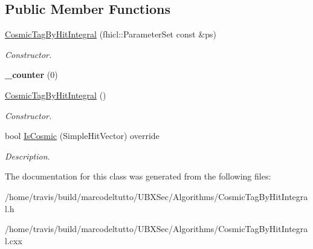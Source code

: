 \subsection*{\-Public \-Member \-Functions}
\begin{DoxyCompactItemize}
\item 
\hypertarget{classubana_1_1CosmicTagByHitIntegral_ae58970463cfcb6fa697e19073da6a91c}{\hyperlink{classubana_1_1CosmicTagByHitIntegral_ae58970463cfcb6fa697e19073da6a91c}{\-Cosmic\-Tag\-By\-Hit\-Integral} (fhicl\-::\-Parameter\-Set const \&ps)}\label{classubana_1_1CosmicTagByHitIntegral_ae58970463cfcb6fa697e19073da6a91c}

\begin{DoxyCompactList}\small\item\em \-Constructor. \end{DoxyCompactList}\item 
\hypertarget{classubana_1_1CosmicTagByHitIntegral_a5fda4bc8f4ea58a9861ac56bed66fe79}{{\bfseries \-\_\-counter} (0)}\label{classubana_1_1CosmicTagByHitIntegral_a5fda4bc8f4ea58a9861ac56bed66fe79}

\item 
\hypertarget{classubana_1_1CosmicTagByHitIntegral_ad51d5460821d3a81262f8515a8e08487}{\hyperlink{classubana_1_1CosmicTagByHitIntegral_ad51d5460821d3a81262f8515a8e08487}{\-Cosmic\-Tag\-By\-Hit\-Integral} ()}\label{classubana_1_1CosmicTagByHitIntegral_ad51d5460821d3a81262f8515a8e08487}

\begin{DoxyCompactList}\small\item\em \-Constructor. \end{DoxyCompactList}\item 
\hypertarget{classubana_1_1CosmicTagByHitIntegral_a33a59b4d8c00231b368879a591e80b5c}{bool \hyperlink{classubana_1_1CosmicTagByHitIntegral_a33a59b4d8c00231b368879a591e80b5c}{\-Is\-Cosmic} (\-Simple\-Hit\-Vector) override}\label{classubana_1_1CosmicTagByHitIntegral_a33a59b4d8c00231b368879a591e80b5c}

\begin{DoxyCompactList}\small\item\em \-Description. \end{DoxyCompactList}\end{DoxyCompactItemize}


\-The documentation for this class was generated from the following files\-:\begin{DoxyCompactItemize}
\item 
/home/travis/build/marcodeltutto/\-U\-B\-X\-Sec/\-Algorithms/\-Cosmic\-Tag\-By\-Hit\-Integral.\-h\item 
/home/travis/build/marcodeltutto/\-U\-B\-X\-Sec/\-Algorithms/\-Cosmic\-Tag\-By\-Hit\-Integral.\-cxx\end{DoxyCompactItemize}
